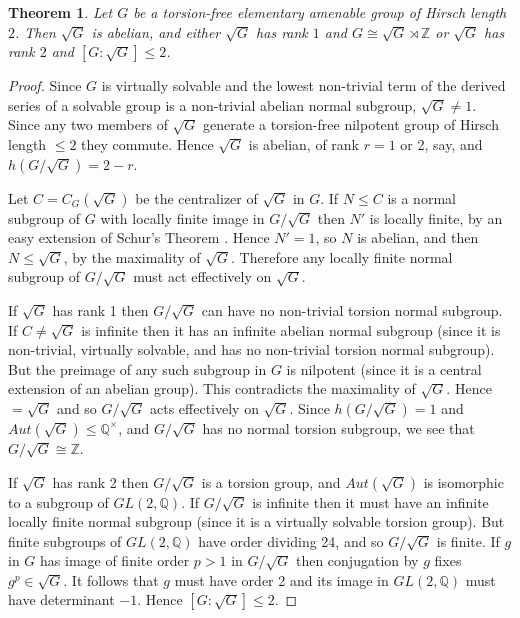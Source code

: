 \documentclass[12pt]{amsart}
\renewcommand{\leq}{\leqslant}
\newtheorem{theorem}{Theorem}
\begin{document}
\begin{theorem}
\label{h=2}
Let $G$ be a torsion-free elementary amenable group of Hirsch length $2$.
Then $\sqrt{G}$ is abelian,
and either $\sqrt{G}$ has rank $1$ and $G\cong\sqrt{G}\rtimes\mathbb{Z}$
or $\sqrt{G}$ has rank $2$ and $[G:\sqrt{G}]\leq2$.
\end{theorem}

\begin{proof}
Since $G$ is virtually solvable \cite{HL92} and the lowest non-trivial term of  
the derived series of a solvable group is 
a non-trivial abelian normal subgroup, $\sqrt{G}\not=1$.
Since any two members of $\sqrt{G}$ generate a torsion-free nilpotent group of Hirsch length $\leq2$ they commute.
Hence $\sqrt{G}$ is abelian, of rank $r=1$ or 2, say, and $h(G/\sqrt{G})=2-r$.

Let $C=C_G(\sqrt{G})$ be the centralizer of $\sqrt{G}$ in $G$.
If $N\leq{C}$ is a normal subgroup of $G$ with locally finite image in 
$G/\sqrt{G}$ then $N'$ is locally finite, 
by an easy extension of Schur's Theorem \cite[10.1.4]{Ro}.
Hence $N'=1$, so $N$ is abelian, and then $N\leq{\sqrt{G}}$,
by the maximality of $\sqrt{G}$.
Therefore any locally finite normal subgroup of $G/\sqrt{G}$ must
act effectively on $\sqrt{G}$.

If $\sqrt{G}$ has rank 1  then $G/\sqrt{G}$ can have no non-trivial torsion normal subgroup.
If $C\not=\sqrt{G}$ is infinite then it has an infinite abelian normal subgroup
(since it is non-trivial, virtually solvable, and has no non-trivial torsion normal subgroup).
But the preimage of any such subgroup in $G$ is nilpotent
(since it is a central extension of an abelian group).
This contradicts the maximality of $\sqrt{G}$.
Hence $=\sqrt{G}$ and so $G/\sqrt{G}$ acts effectively on $\sqrt{G}$.
Since $h(G/\sqrt{G})=1$ and $Aut(\sqrt{G})\leq\mathbb{Q}^\times$,
and $G/\sqrt{G}$ has no normal torsion subgroup,
we see that $G/\sqrt{G}\cong\mathbb{Z}$.

If $\sqrt{G}$ has rank 2 then $G/\sqrt{G}$ is a torsion group,
and $Aut(\sqrt{G})$ is isomorphic to a subgroup of $GL(2,\mathbb{Q})$.
If $G/\sqrt{G}$ is infinite then it must have an infinite locally finite normal subgroup
(since it is a virtually solvable torsion group).
But finite subgroups of $GL(2,\mathbb{Q})$ have order dividing 24,
and so $G/\sqrt{G}$ is finite. 
If $g$ in $G$ has image of finite order $p>1$ in $G/\sqrt{G}$
then conjugation by $g$ fixes $g^p\in\sqrt{G}$.
It follows that $g$ must have order 2 and its image in $GL(2,\mathbb{Q})$ 
must have determinant $-1$.
Hence $[G:\sqrt{G}]\leq2$.
\end{proof}
\end{document}
